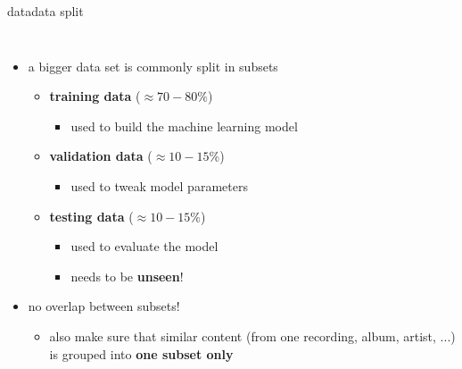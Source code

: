         \begin{frame}{data}{data split}
            \vspace{-5mm}
            \begin{columns}
            \begin{itemize}
                \item   a bigger data set is commonly split in subsets
                    \smallskip
                    \begin{itemize}
                        \item   \textbf{training data} ($\approx 70-80\%$)
                            \begin{itemize}
                                \item   used to build the machine learning model
                            \end{itemize}
                        \smallskip
                        \item   \textbf{validation data }($\approx 10-15\%$)
                            \begin{itemize}
                                \item   used to tweak model parameters
                            \end{itemize}
                        \smallskip
                        \item   \textbf{testing data} ($\approx 10-15\%$)
                            \begin{itemize}
                                \item   used to evaluate the model
                                \item   needs to be \textbf{unseen}!
                            \end{itemize}
                    \end{itemize}
                \bigskip
                \pause
                \item   no overlap between subsets!
                    \begin{itemize}
                        \item also make sure that similar content (from one recording, album, artist, ...) is grouped into \textbf{one subset only}
                    \end{itemize}
            \end{itemize}
            \end{columns}
        \end{frame}
        
